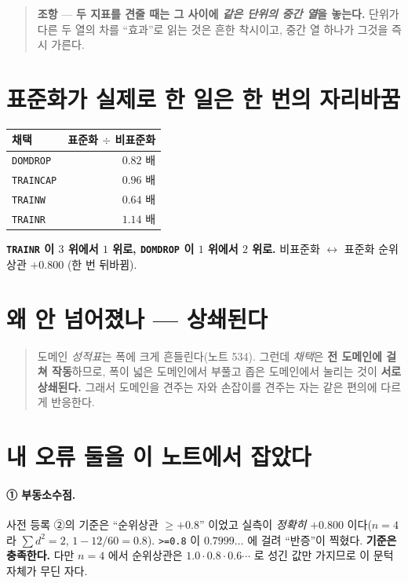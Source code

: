 \documentclass[11pt]{article}
\begin{document}
\begin{quote}
\textbf{조항} --- \textbf{두 지표를 견줄 때는 그 사이에 \emph{같은 단위의
중간 열}을 놓는다.} 단위가 다른 두 열의 차를 ``효과''로 읽는 것은 흔한
착시이고, 중간 열 하나가 그것을 즉시 가른다.
\end{quote}

\section{표준화가 실제로 한 일은 한 번의 자리바꿈}

\begin{center}
\begin{tabular}{lr}
\hline
채택 & 표준화 $\div$ 비표준화 \\
\hline
\texttt{DOMDROP} & $0.82$ 배 \\
\texttt{TRAINCAP} & $0.96$ 배 \\
\texttt{TRAINW} & $0.64$ 배 \\
\texttt{TRAINR} & $\mathbf{1.14}$ 배 \\
\hline
\end{tabular}
\end{center}

\textbf{\texttt{TRAINR} 이 $3$ 위에서 $1$ 위로, \texttt{DOMDROP} 이 $1$ 위에서
$2$ 위로.} 비표준화 $\leftrightarrow$ 표준화 순위상관 $+0.800$ (한 번 뒤바뀜).

\section{왜 안 넘어졌나 --- 상쇄된다}

\begin{quote}
도메인 \emph{성적표}는 폭에 크게 흔들린다(노트 534). 그런데 \emph{채택}은
\textbf{전 도메인에 걸쳐 작동}하므로, 폭이 넓은 도메인에서 부풀고 좁은
도메인에서 눌리는 것이 \textbf{서로 상쇄된다.} 그래서 도메인을 견주는
자와 손잡이를 견주는 자는 같은 편의에 다르게 반응한다.
\end{quote}

\section{내 오류 둘을 이 노트에서 잡았다}

\paragraph{① 부동소수점.} 사전 등록 ②의 기준은 ``순위상관 $\ge +0.8$''
이었고 실측이 \emph{정확히} $+0.800$ 이다($n=4$ 라 $\sum d^2 = 2$,
$1 - 12/60 = 0.8$). \texttt{>=0.8} 이 $0.7999\ldots$ 에 걸려 ``반증''이
찍혔다. \textbf{기준은 충족한다.} 다만 $n=4$ 에서 순위상관은 $1.0 \cdot 0.8
\cdot 0.6 \cdots$ 로 성긴 값만 가지므로 이 문턱 자체가 무딘 자다.
\end{document}

